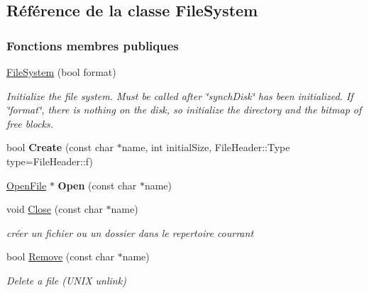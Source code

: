\hypertarget{class_file_system}{}\subsection{Référence de la classe File\+System}
\label{class_file_system}
\subsubsection*{Fonctions membres publiques}
\begin{DoxyCompactItemize}
\item 
\hypertarget{class_file_system_aa20f3ad23274f0c10b23f2fe00b30b23}{}\label{class_file_system_aa20f3ad23274f0c10b23f2fe00b30b23} 
\hyperlink{class_file_system_aa20f3ad23274f0c10b23f2fe00b30b23}{File\+System} (bool format)
\begin{DoxyCompactList}\small\item\em Initialize the file system. Must be called {\itshape after} \char`\"{}synch\+Disk\char`\"{} has been initialized. If \char`\"{}format\char`\"{}, there is nothing on the disk, so initialize the directory and the bitmap of free blocks. \end{DoxyCompactList}\item 
\hypertarget{class_file_system_ad6fc1591cd298f34c4655a6ea64afbef}{}\label{class_file_system_ad6fc1591cd298f34c4655a6ea64afbef} 
bool {\bfseries Create} (const char $\ast$name, int initial\+Size, File\+Header\+::\+Type type=File\+Header\+::f)
\item 
\hypertarget{class_file_system_affae6d7e2deb69df4da1b7e2ccf340df}{}\label{class_file_system_affae6d7e2deb69df4da1b7e2ccf340df} 
\hyperlink{class_open_file}{Open\+File} $\ast$ {\bfseries Open} (const char $\ast$name)
\item 
void \hyperlink{class_file_system_a52b38efbde699112b9b79ed029a394ea}{Close} (const char $\ast$name)
\begin{DoxyCompactList}\small\item\em créer un fichier ou un dossier dans le repertoire courrant \end{DoxyCompactList}\item 
\hypertarget{class_file_system_acde5af39108d5a11699af421ceeb29b5}{}\label{class_file_system_acde5af39108d5a11699af421ceeb29b5} 
bool \hyperlink{class_file_system_acde5af39108d5a11699af421ceeb29b5}{Remove} (const char $\ast$name)
\begin{DoxyCompactList}\small\item\em Delete a file (U\+N\+IX unlink) \end{DoxyCompactList}\item 

\end{DoxyCompactItemize}
